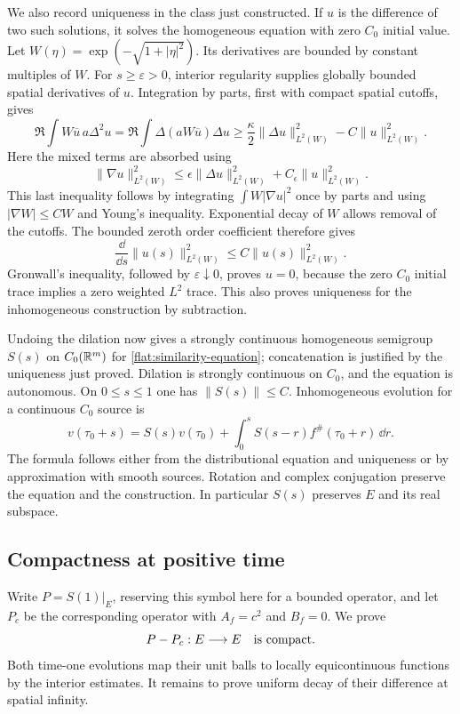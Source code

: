 We also record uniqueness in the class just constructed. If $u$ is
the difference of two such solutions, it solves the homogeneous
equation with zero $C_0$ initial value. Let
$W(\eta)=\exp(-\sqrt{1+|\eta|^2})$. Its derivatives are bounded by
constant multiples of $W$. For $s\ge\varepsilon>0$, interior
regularity supplies globally bounded spatial derivatives of $u$.
Integration by parts, first with compact spatial cutoffs, gives
\[
 \Re\int W\overline u\,a\Delta^2u
 =\Re\int\Delta(aW\overline u)\Delta u
 \ge\frac\kappa2\|\Delta u\|_{L^2(W)}^2
                  -C\|u\|_{L^2(W)}^2.
\]
Here the mixed terms are absorbed using
\[
 \|\nabla u\|_{L^2(W)}^2
 \le\epsilon\|\Delta u\|_{L^2(W)}^2
                 +C_\epsilon\|u\|_{L^2(W)}^2.
\]
This last inequality follows by integrating
$\int W|\nabla u|^2$ once by parts and using
$|\nabla W|\le CW$ and Young's inequality. Exponential decay of $W$
allows removal of the cutoffs. The bounded zeroth order coefficient
therefore gives
\[
 \frac{\dd}{\dd s}\|u(s)\|_{L^2(W)}^2
 \le C\|u(s)\|_{L^2(W)}^2.
\]
Gronwall's inequality, followed by $\varepsilon\downarrow0$, proves
$u=0$, because the zero $C_0$ initial trace implies a zero weighted
$L^2$ trace. This also proves uniqueness for the inhomogeneous
construction by subtraction.

Undoing the dilation now gives a strongly continuous homogeneous
semigroup $S(s)$ on $C_0(\mathbb{R}^m)$ for
\eqref{flat:similarity-equation}; concatenation is justified by the
uniqueness just proved. Dilation is strongly continuous on $C_0$,
and the equation is autonomous. On $0\le s\le1$ one has
$\|S(s)\|\le C$. Inhomogeneous evolution for a continuous $C_0$ source
is
\begin{equation}\label{flat:duhamel}
 v(\tau_0+s)=S(s)v(\tau_0)
       +\int_0^sS(s-r)f^\#(\tau_0+r)\,\dd r.
\end{equation}
The formula follows either from the distributional equation and
uniqueness or by approximation with smooth sources. Rotation and
complex conjugation preserve the equation and the construction.
In particular $S(s)$ preserves $E$ and its real subspace.

\subsection{Compactness at positive time}

Write $P=S(1)|_E$, reserving this symbol here for a bounded operator,
and let $P_c$ be the corresponding operator with $A_f=c^2$ and
$B_f=0$. We prove
\begin{equation}\label{flat:compact-difference}
 P-P_c:E\longrightarrow E\quad\hbox{is compact}.
\end{equation}
Both time-one evolutions map their unit balls to locally
equicontinuous functions by the interior estimates. It remains to
prove uniform decay of their difference at spatial infinity.

